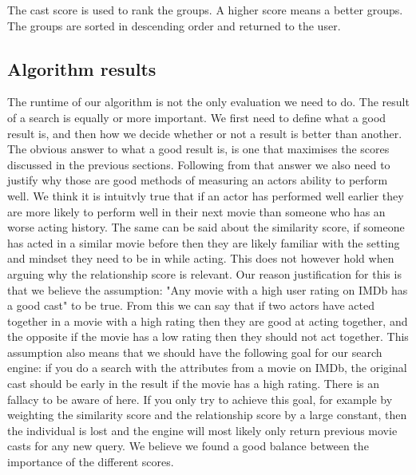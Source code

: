 The cast score is used to rank the groups. A higher score means a better groups. The groups are sorted in descending order and returned to the user.

\subsection{Algorithm results}
The runtime of our algorithm is not the only evaluation we need to do. The result of a search is equally or more important. We first need to define what a good result is, and then how we decide whether or not a result is better than another. The obvious answer to what a good result is, is one that maximises the scores discussed in the previous sections. Following from that answer we also need to justify why those are good methods of measuring an actors ability to perform well. We think it is intuitvly true that if an actor has performed well earlier they are more likely to perform well in their next movie than someone who has an worse acting history. The same can be said about the similarity score, if someone has acted in a similar movie before then they are likely familiar with the setting and mindset they need to be in while acting. This does not however hold when arguing why the relationship score is relevant. Our reason justification for this is that we believe the assumption: "Any movie with a high user rating on IMDb has a good cast" to be true. From this we can say that if two actors have acted together in a movie with a high rating then they are good at acting together, and the opposite if the movie has a low rating then they should not act together. This assumption also means that we should have the following goal for our search engine: if you do a search with the attributes from a movie on IMDb, the original cast should be early in the result if the movie has a high rating. There is an fallacy to be aware of here. If you only try to achieve this goal, for example by weighting the similarity score and the relationship score by a large constant, then the individual is lost and the engine will most likely only return previous movie casts for any new query. We believe we found a good balance between the importance of the different scores. 


